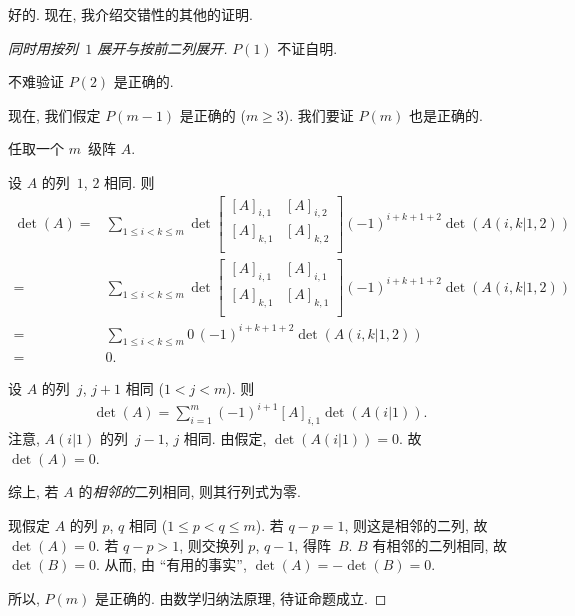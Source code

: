 好的.
现在, 我介绍交错性的其他的证明.

\begin{proof}[同时用按列~\(1\) 展开与按前二列展开]
    \(P(1)\) 不证自明.

    不难验证 \(P(2)\) 是正确的.

    现在, 我们假定 \(P(m-1)\) 是正确的 (\(m \geq 3\)).
    我们要证 \(P(m)\) 也是正确的.

    任取一个 \(m\)~级阵 \(A\).

    设 \(A\) 的列~\(1\), \(2\) 相同.
    则
    \begin{align*}
        \det {(A)}
        = {} &
        \sum_{1 \leq i < k \leq m}
        {\det {
                \begin{bmatrix}
                    [A]_{i,1} & [A]_{i,2} \\
                    [A]_{k,1} & [A]_{k,2} \\
                \end{bmatrix}
            }
            (-1)^{i+k+1+2}
            \det {(A(i,k|1,2))}}
        \\
        = {} &
        \sum_{1 \leq i < k \leq m}
        {\det {
                \begin{bmatrix}
                    [A]_{i,1} & [A]_{i,1} \\
                    [A]_{k,1} & [A]_{k,1} \\
                \end{bmatrix}
            }
            (-1)^{i+k+1+2}
            \det {(A(i,k|1,2))}}
        \\
        = {} &
        \sum_{1 \leq i < k \leq m}
        {0\, (-1)^{i+k+1+2} \det {(A(i,k|1,2))}}
        \\
        = {} & 0.
    \end{align*}

    设 \(A\) 的列~\(j\), \(j+1\) 相同 (\(1 < j < m\)).
    则
    \begin{align*}
        \det {(A)}
        = \sum_{i = 1}^{m} {(-1)^{i + 1} [A]_{i,1}
        \det {(A(i|1))}}.
    \end{align*}
    注意, \(A(i|1)\) 的列~\(j-1\), \(j\) 相同.
    由假定, \(\det {(A(i|1))} = 0\).
    故 \(\det {(A)} = 0\).

    综上,
    若 \(A\) 的\emph{相邻的}二列相同,
    则其行列式为零.

    现假定 \(A\) 的列 \(p\), \(q\) 相同
    (\(1 \leq p < q \leq m\)).
    若 \(q - p = 1\), 则这是相邻的二列,
    故 \(\det {(A)} = 0\).
    若 \(q - p > 1\), 则交换列 \(p\), \(q-1\),
    得阵~\(B\).
    \(B\) 有相邻的二列相同, 故 \(\det {(B)} = 0\).
    从而, 由 ``有用的事实'',
    \(\det {(A)} = -\det {(B)} = 0\).

    所以, \(P(m)\) 是正确的.
    由数学归纳法原理, 待证命题成立.
\end{proof}

